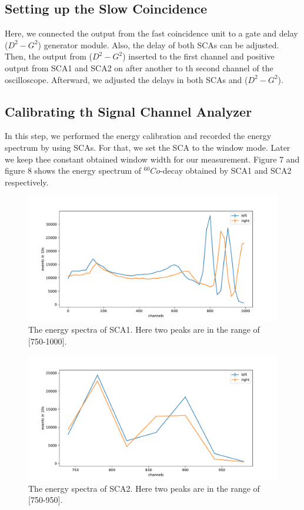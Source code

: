 \subsection{Setting up the Slow Coincidence}
Here, we connected the output from the fast coincidence unit to a gate and delay ($ D^{2}-G^{2} $) generator module. Also, the delay of both SCAs can be adjusted. Then, the output from ($ D^{2}-G^{2} $) inserted to the first channel and positive output from SCA1 and SCA2 on after another to th second channel of the oscilloscope. Afterward, we adjusted the delays in both SCAs and ($ D^{2}-G^{2} $). 

\subsection{Calibrating th Signal Channel Analyzer}
In this step, we performed the energy calibration and recorded the energy spectrum by using SCAs. For that, we set the SCA to the window mode. Later  we keep thee constant obtained window width for our measurement. Figure 7 and figure 8 shows the energy spectrum of $ ^{60}Co$-decay obtained by SCA1 and SCA2 respectively.
\begin{figure}[ht]
	\centering
	\includegraphics[width=0.8\linewidth]{./figs/sca.pdf}
	\caption{The energy spectra of SCA1. Here two peaks are in the range of [750-1000].}%
	\label{fig:angAsymm}
\end{figure}

\begin{figure}[ht]
	\centering
	\includegraphics[width=0.8\linewidth]{./figs/sca2.pdf}
	\caption{The energy spectra of SCA2. Here two peaks are in the range of [750-950].}%
	\label{fig:angAsymm}
\end{figure}


